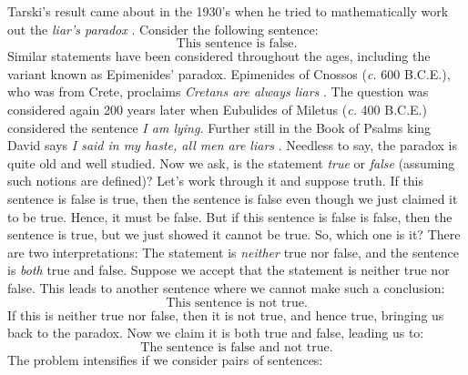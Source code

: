         Tarski's result came about in the 1930's when he tried to mathematically
        work out the \textit{liar's paradox}%
         \cite{TarskiUndefinability}. Consider the
        following sentence:
        \begin{equation}
            \text{This sentence is false.}
        \end{equation}
        Similar statements have been considered throughout the ages, including
        the variant known as Epimenides' paradox.
        Epimenides of Cnossos (\textit{c.} 600 B.C.E.), who was from Crete,
        proclaims \textit{Cretans are always liars} \cite{KingJamesBible}. The
        question was considered again 200 years later when Eubulides of Miletus
        (\textit{c.} 400 B.C.E.) considered the sentence \textit{I am lying.}
        Further still in the Book of Psalms king David says
        \textit{I said in my haste, all men are liars} \cite{KingJamesBible}.
        Needless to say, the paradox is quite old and well studied. Now we ask,
        is the statement \textit{true} or \textit{false} (assuming such notions
        are defined)? Let's work through it and suppose truth. If this sentence
        is false is true, then the sentence is false even though we just claimed
        it to be true. Hence, it must be false. But if this sentence is false is
        false, then the sentence is true, but we just showed it cannot be true.
        So, which one is it? There are two interpretations: The statement is
        \textit{neither} true nor false, and the sentence is \textit{both} true
        and false. Suppose we accept that the statement is neither true nor
        false. This leads to another sentence where we cannot make such a
        conclusion:
        \begin{equation}
            \text{This sentence is not true.}
        \end{equation}
        If this is neither true nor false, then it is not true, and hence true,
        bringing us back to the paradox. Now we claim it is both true and false,
        leading us to:
        \begin{equation}
            \text{The sentence is false and not true.}
        \end{equation}
        The problem intensifies if we consider pairs of sentences:
